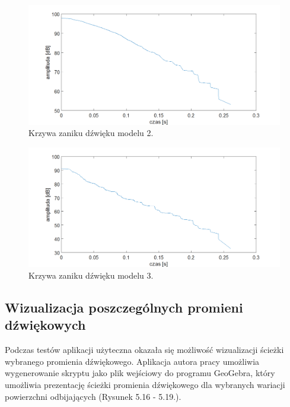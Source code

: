 \begin{figure}[h]
        \centering
                \centering
                \includegraphics[width=16cm]{zanikz2}
	\caption{Krzywa zaniku dźwięku modelu 2.}
\end{figure}

\begin{figure}[h]
        \centering
                \centering
                \includegraphics[width=16cm]{zanikz3}
	\caption{Krzywa zaniku dźwięku modelu 3.}
\end{figure}


\subsection{Wizualizacja poszczególnych promieni dźwiękowych}\label{sec:imstest2}

Podczas testów aplikacji użyteczna okazała się możliwość wizualizacji ścieżki wybranego promienia dźwiękowego. Aplikacja autora pracy umożliwia wygenerowanie skryptu jako plik wejściowy do programu GeoGebra, który umożliwia prezentację ścieżki promienia dźwiękowego dla wybranych wariacji powierzchni odbijających (Rysunek 5.16 - 5.19.).  

